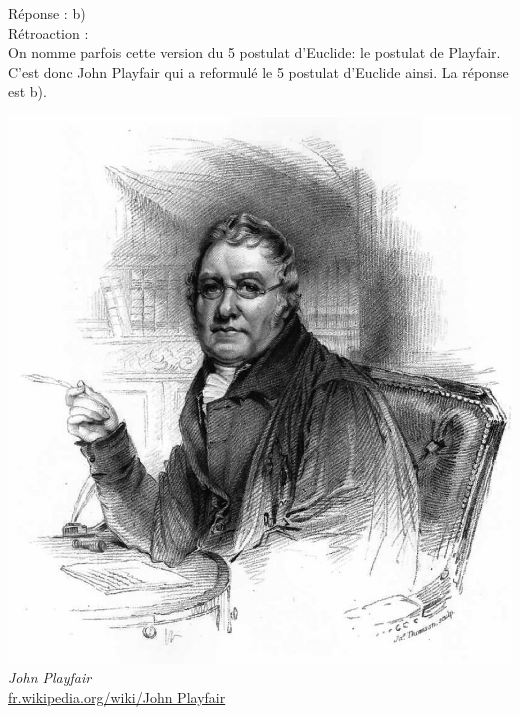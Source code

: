 \documentclass[letterpaper, 12pt]{article}
\begin{document}
R\'eponse : b)\\

R\'etroaction :\\
On nomme parfois cette version du 5\ieme{} postulat d'Euclide: le postulat de Playfair. C'est donc John Playfair qui a reformul\'e le 5\ieme{} postulat d'Euclide ainsi. La r\'eponse est b).
\begin{center}
\includegraphics[scale=0.15]{John_Playfair.eps}\\
\emph{{\small John Playfair}}\\
\href{http://fr.wikipedia.org/wiki/John_Playfair}{fr.wikipedia.org/wiki/John Playfair}\\[5mm]
\end{center}
\end{document}
